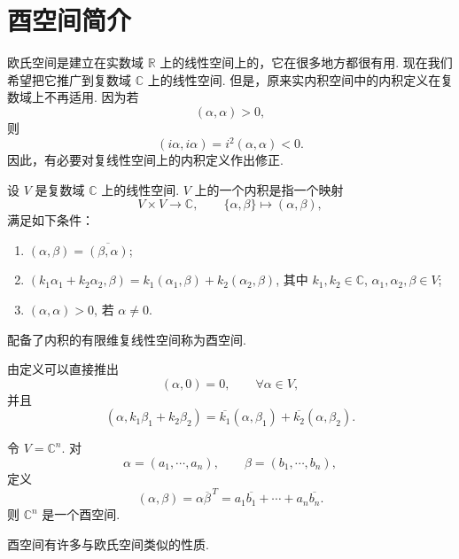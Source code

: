\section{酉空间简介}

欧氏空间是建立在实数域 $\mathbb{R}$ 上的线性空间上的，它在很多地方都很有用.
现在我们希望把它推广到复数域 $\mathbb{C}$ 上的线性空间.
但是，原来实内积空间中的内积定义在复数域上不再适用. 因为若
\[
(\alpha,\alpha)>0,
\]
则
\[
(i\alpha,i\alpha)=i^2(\alpha,\alpha)<0.
\]
因此，有必要对复线性空间上的内积定义作出修正.

\begin{definition}
	设 $V$ 是复数域 $\mathbb{C}$ 上的线性空间. $V$ 上的一个内积是指一个映射
	\[
	V\times V\longrightarrow \mathbb{C},
	\qquad
	\{\alpha,\beta\}\longmapsto (\alpha,\beta),
	\]
	满足如下条件：
	\begin{enumerate}
		\item $(\alpha,\beta)=\overline{(\beta,\alpha)}$;
		\item $(k_1\alpha_1+k_2\alpha_2,\beta)
		=k_1(\alpha_1,\beta)+k_2(\alpha_2,\beta)$,
		其中 $k_1,k_2\in\mathbb{C}$, $\alpha_1,\alpha_2,\beta\in V$;
		\item $(\alpha,\alpha)>0$, 若 $\alpha\ne0$.
	\end{enumerate}
	配备了内积的有限维复线性空间称为酉空间.
\end{definition}

由定义可以直接推出
\[
(\alpha,0)=0,
\qquad
\forall \alpha\in V,
\]
并且
\[
(\alpha,k_1\beta_1+k_2\beta_2)
=\overline{k_1}(\alpha,\beta_1)+\overline{k_2}(\alpha,\beta_2).
\]

\begin{example}
	令 $V=\mathbb{C}^n$. 对
	\[
	\alpha=(a_1,\cdots,a_n),
	\qquad
	\beta=(b_1,\cdots,b_n),
	\]
	定义
	\[
	(\alpha,\beta)=\alpha\overline{\beta}^{\,T}
	=a_1\overline{b_1}+\cdots+a_n\overline{b_n}.
	\]
	则 $\mathbb{C}^n$ 是一个酉空间.
\end{example}

酉空间有许多与欧氏空间类似的性质.

